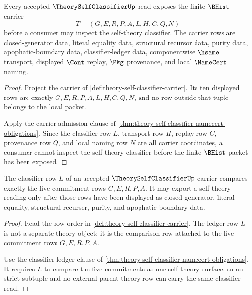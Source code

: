 \begin{theorem}
\label{thm:theoryselfclassifier-carrier-obligation}
Every accepted $\TheorySelfClassifierUp$ read exposes the finite $\BHist$ carrier
$$
T=(G,E,R,P,A,L,H,C,Q,N)
$$
before a consumer may inspect the self-theory classifier. The carrier rows are closed-generator data, literal equality data, structural recursor data, purity data, apophatic-boundary data, classifier-ledger data, componentwise $\hsame$ transport, displayed $\Cont$ replay, $\Pkg$ provenance, and local $\NameCert$ naming.
\end{theorem}
\begin{proof}
Project the carrier of \autoref{def:theory-self-classifier-carrier}. Its ten displayed rows are exactly $G,E,R,P,A,L,H,C,Q,N$, and no row outside that tuple belongs to the local packet.

Apply the carrier-admission clause of \autoref{thm:theory-self-classifier-namecert-obligations}. Since the classifier row $L$, transport row $H$, replay row $C$, provenance row $Q$, and local naming row $N$ are all carrier coordinates, a consumer cannot inspect the self-theory classifier before the finite $\BHist$ packet has been exposed.
\end{proof}

\begin{theorem}
\label{thm:theoryselfclassifier-classifier-obligation}
The classifier row $L$ of an accepted $\TheorySelfClassifierUp$ carrier compares exactly the five commitment rows $G,E,R,P,A$. It may export a self-theory reading only after those rows have been displayed as closed-generator, literal-equality, structural-recursor, purity, and apophatic-boundary data.
\end{theorem}
\begin{proof}
Read the row order in \autoref{def:theory-self-classifier-carrier}. The ledger row $L$ is not a separate theory object; it is the comparison row attached to the five commitment rows $G,E,R,P,A$.

Use the classifier-ledger clause of \autoref{thm:theory-self-classifier-namecert-obligations}. It requires $L$ to compare the five commitments as one self-theory surface, so no strict subtuple and no external parent-theory row can carry the same classifier read.
\end{proof}


